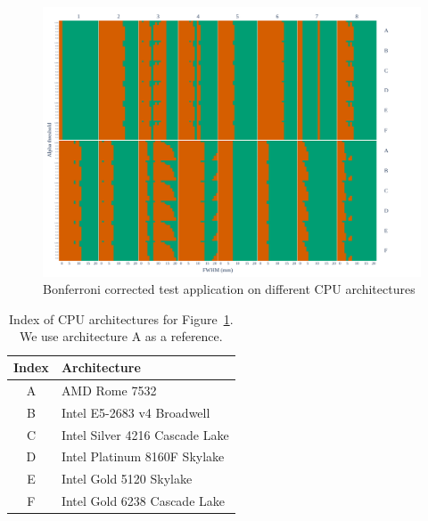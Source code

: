 \documentclass{article}
\begin{document}
\begin{figure}
    \centering
    \includegraphics[width=\linewidth]{figures/arch/arch_mct_fwe_bonferroni_.pdf}
    \caption{Bonferroni corrected test application on different CPU architectures}
    \label{fig:arch_bonferroni}
\end{figure}

\begin{table}
    \begin{center}
        \begin{tabular}{c|l}
            Index & Architecture                   \\
            \hline
            A     & AMD Rome 7532                  \\
            B     & Intel E5-2683 v4 Broadwell     \\
            C     & Intel Silver 4216 Cascade Lake \\
            D     & Intel Platinum 8160F Skylake   \\
            E     & Intel Gold 5120 Skylake        \\
            F     & Intel Gold 6238 Cascade Lake
        \end{tabular}
    \end{center}
    \caption{Index of CPU architectures for Figure~\ref{fig:arch_bonferroni}. We use architecture A as a reference.}
    \label{tab:index-arch-map}
\end{table}
\end{document}
